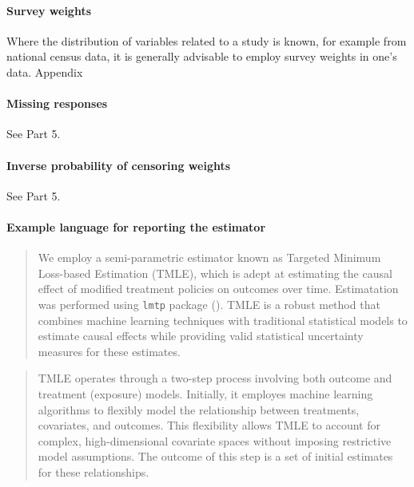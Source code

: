 \documentclass[
  singlecolumn]{article}
\let\oldparagraph\paragraph
\renewcommand{\paragraph}[1]{\oldparagraph{#1}\mbox{}}
\begin{document}
\paragraph{Survey weights}\label{survey-weights}

Where the distribution of variables related to a study is known, for
example from national census data, it is generally advisable to employ
survey weights in one's data. Appendix

\paragraph{Missing responses}\label{missing-responses}

See Part 5.

\paragraph{Inverse probability of censoring
weights}\label{inverse-probability-of-censoring-weights}

See Part 5.

\paragraph{Example language for reporting the
estimator}\label{example-language-for-reporting-the-estimator}

\begin{quote}
We employ a semi-parametric estimator known as Targeted Minimum
Loss-based Estimation (TMLE), which is adept at estimating the causal
effect of modified treatment policies on outcomes over time.
Estimatation was performed using \texttt{lmtp} package
(). TMLE is a robust
method that combines machine learning techniques with traditional
statistical models to estimate causal effects while providing valid
statistical uncertainty measures for these estimates.
\end{quote}

\begin{quote}
TMLE operates through a two-step process involving both outcome and
treatment (exposure) models. Initially, it employes machine learning
algorithms to flexibly model the relationship between treatments,
covariates, and outcomes. This flexibility allows TMLE to account for
complex, high-dimensional covariate spaces without imposing restrictive
model assumptions. The outcome of this step is a set of initial
estimates for these relationships.
\end{quote}
\end{document}
